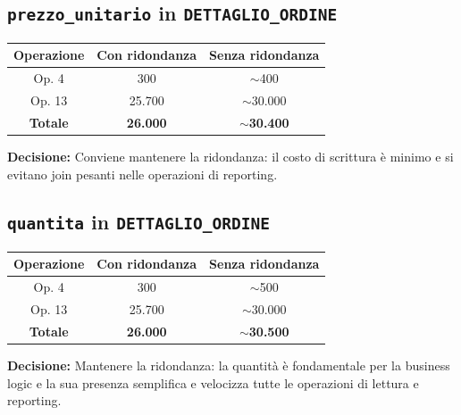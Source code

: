 \documentclass[a4paper,12pt]{report}
\begin{document}
\newpage
\subsection{\texttt{prezzo\_unitario} in \texttt{DETTAGLIO\_ORDINE}}

\begin{table}[H]
	\centering
	\begin{tabular}{|c|c|c|}
		\hline
		\textbf{Operazione} & \textbf{Con ridondanza} & \textbf{Senza ridondanza} \\
		\hline
		Op. 4               & 300                     & $\sim$400                 \\
		\hline
		Op. 13              & 25.700                  & $\sim$30.000              \\
		\hline
		\textbf{Totale}     & \textbf{26.000}         & $\sim$\textbf{30.400}     \\
		\hline
	\end{tabular}
\end{table}

\textbf{Decisione:} Conviene mantenere la ridondanza: il costo di scrittura è minimo e si evitano join pesanti nelle operazioni di reporting.

\subsection{\texttt{quantita} in \texttt{DETTAGLIO\_ORDINE}}
\begin{table}[H]
	\centering
	\begin{tabular}{|c|c|c|}
		\hline
		\textbf{Operazione} & \textbf{Con ridondanza} & \textbf{Senza ridondanza} \\
		\hline
		Op. 4               & 300                     & $\sim$500                 \\
		\hline
		Op. 13              & 25.700                  & $\sim$30.000              \\
		\hline
		\textbf{Totale}     & \textbf{26.000}         & $\sim$\textbf{30.500}     \\
		\hline
	\end{tabular}
\end{table}

\textbf{Decisione:} Mantenere la ridondanza: la quantità è fondamentale per la business logic e la sua presenza semplifica e velocizza tutte le operazioni di lettura e reporting.
\end{document}
